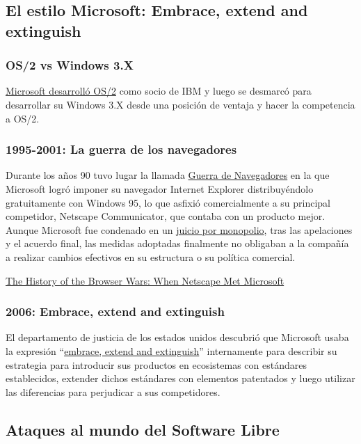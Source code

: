 \documentclass[10pt, titlepage]{article}
\begin{document}
\subsection{El estilo Microsoft: Embrace, extend and extinguish}

\subsubsection{OS/2 vs Windows 3.X}
\href{https://www.quora.com/Why-did-IBMs-OS-2-project-lose-to-Microsoft-given-that-IBM-had-much-more-resources-than-Microsoft-at-that-time}{Microsoft desarrolló OS/2} como socio de IBM y luego se desmarcó para desarrollar su Windows 3.X desde una posición de ventaja y hacer la competencia a OS/2.

\subsubsection{1995-2001: La guerra de los navegadores}
Durante los años 90 tuvo lugar la llamada \href{https://es.wikipedia.org/wiki/Guerra_de_navegadores}{Guerra de Navegadores} en la que Microsoft logró imponer su navegador Internet Explorer distribuyéndolo gratuitamente con Windows 95, lo que asfixió comercialmente a su principal competidor, Netscape Communicator, que contaba con un producto mejor. Aunque Microsoft fue condenado en un \href{https://es.wikipedia.org/wiki/Caso_Estados_Unidos_contra_Microsoft}{juicio por monopolio}, tras las apelaciones y el acuerdo final, las medidas adoptadas finalmente no obligaban a la compañía a realizar cambios efectivos en su estructura o su política comercial.

\href{https://thehistoryoftheweb.com/browser-wars/}{The History of the Browser Wars: When Netscape Met Microsoft}

\subsubsection{2006: Embrace, extend and extinguish}
El departamento de justicia de los estados unidos descubrió que Microsoft usaba la expresión ``\href{https://en.wikipedia.org/wiki/Embrace,_extend,_and_extinguish}{embrace, extend and extinguish}'' internamente para describir su estrategia para introducir sus productos en ecosistemas con estándares establecidos, extender dichos estándares con elementos patentados y luego utilizar las diferencias para perjudicar a sus competidores.

\subsection{Ataques al mundo del Software Libre}
\end{document}
